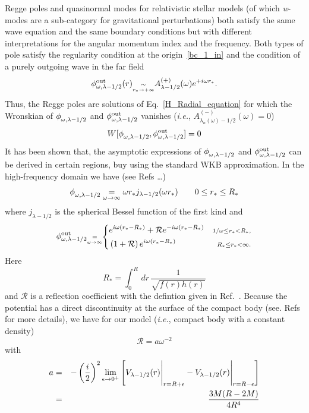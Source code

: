\documentclass[aps,prd,longbibliography,reprint,twocolumn,amsmath,amssymb,amsfonts,showpacs,superscriptaddress]{revtex4-1}%
\begin{document}
Regge poles and quasinormal modes for relativistic stellar models (of which \textit{w}-modes are a sub-category for gravitational perturbations) both satisfy the same wave equation and the same boundary conditions but with different interpretations for the angular momentum index and the frequency. Both types of pole satisfy the regularity condition at the origin~\eqref{bc_1_in} and the condition of a purely outgoing wave in the far field
%
\begin{equation}\label{bc_pole_inf}
\phi^{\text{out}}_{\omega, \lambda-1/2} (r) \scriptstyle{\underset{r_\ast \to +\infty}{\sim}}
\displaystyle{  A^{(+)}_{\lambda-1/2} (\omega) e^{+i\omega r_\ast}}.
\end{equation}
%
Thus, the Regge poles are solutions of Eq.~\eqref{H_Radial_equation} for which the  Wronskian of $\phi^{}_{\omega, \lambda-1/2}$ and $\phi^{\text{out}}_{\omega, \lambda-1/2}$ vanishes (\textit{i.e.}, $A^{(-)}_{\lambda_n(\omega)-1/2} (\omega)=0$)
\begin{equation}\label{Wronskian}
  W[\phi^{}_{\omega, \lambda-1/2}, \phi^{\text{out}}_{\omega, \lambda-1/2} ]= 0
\end{equation}
It has been shown that, the asymptotic expressions of $\phi^{}_{\omega, \lambda-1/2}$ and $\phi^{\text{out}}_{\omega, \lambda-1/2}$ can be derived in certain regions, buy using the standard WKB approximation. In the high-frequency domain we have (see Refs \ldots)
\begin{equation}\label{Approx_origin}
  \phi^{}_{\omega, \lambda-1/2} \underset{\omega \to \infty}{=} \omega r_* j_{\lambda-1/2} (\omega r_*) \quad\quad 0\leq r_*\leq R_*
\end{equation}
where $j_{\lambda-1/2}$ is the spherical Bessel function of the first kind and
\begin{equation}
\label{Approx_infinity}
\phi^{\text{out}}_{\omega, \lambda-1/2}  \scriptstyle{\underset{\omega \to \infty}{=}}
\left\{
\begin{aligned}
&e^{i\omega(r_*-R_*)}+\mathcal{R} e^{-i\omega (r_*-R_*)}& \scriptstyle{1/\omega\leq r_{*} < R_*,}\\
&\left(1+\mathcal{R}\right) e^{i\omega(r_*-R_*)}        & \scriptstyle{R_*\leq r_{*}<\infty.}
\end{aligned}
\right.
\end{equation}
Here
\begin{equation}\label{R_star}
  R_*=\int_{0}^{R}\, dr\,\frac{1}{\sqrt{f(r)h(r)}}
\end{equation}
and $\mathcal{R}$ is a reflection coefficient with the defintion given in Ref.~\cite{Berry_1982}.
Because the potential has a direct discontinuity at the surface of the compact body (see. Refs \cite{Zhang:2011pq,Berry_1982} for more details), we have for our model (\textit{i.e.}, compact body with a constant density)
\begin{equation}\label{R_reflection_1}
  \mathcal{R} = a \omega^{-2}
\end{equation}
with
\begin{eqnarray}
  a &=& -\left(\frac{i}{2}\right)^2 \lim_{\epsilon\to 0^{+}} \left[V_{\lambda-1/2}(r)\Bigg{|}_{r=R+\epsilon}-V_{\lambda-1/2}(r)\Bigg{|}_{r=R-\epsilon}\right] \nonumber\\
   &=& \frac{3M(R-2M)}{4 R^4}
\end{eqnarray}
\end{document}
